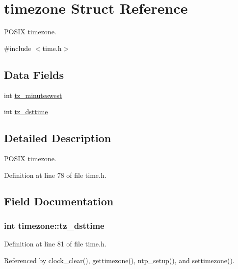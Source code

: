 \hypertarget{structtimezone}{}\section{timezone Struct Reference}
\label{structtimezone}


P\+O\+S\+IX timezone.  




{\ttfamily \#include $<$time.\+h$>$}

\subsection*{Data Fields}
\begin{DoxyCompactItemize}
\item 
int \hyperlink{structtimezone_a3042f7eff6e1b980728def76b1fa0eb7}{tz\+\_\+minuteswest}
\item 
int \hyperlink{structtimezone_a85259977aeb63b17e6ce94f19afdfd99}{tz\+\_\+dsttime}
\end{DoxyCompactItemize}


\subsection{Detailed Description}
P\+O\+S\+IX timezone. 

Definition at line 78 of file time.\+h.



\subsection{Field Documentation}
\subsubsection[{\texorpdfstring{tz\+\_\+dsttime}{tz_dsttime}}]{\setlength{\rightskip}{0pt plus 5cm}int timezone\+::tz\+\_\+dsttime}\hypertarget{structtimezone_a85259977aeb63b17e6ce94f19afdfd99}{}\label{structtimezone_a85259977aeb63b17e6ce94f19afdfd99}


Definition at line 81 of file time.\+h.



Referenced by clock\+\_\+clear(), gettimezone(), ntp\+\_\+setup(), and settimezone().

